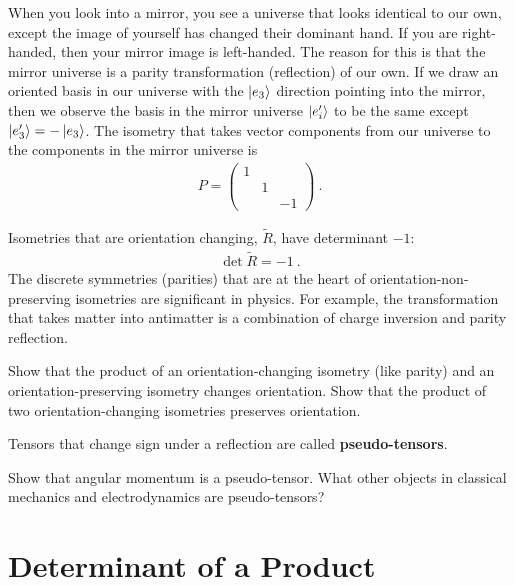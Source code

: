 \begin{example} When you look into a mirror, you see a universe that looks identical to our own, except the image of yourself has changed their dominant hand. If you are right-handed, then your mirror image is left-handed. The reason for this is that the mirror universe is a parity transformation (reflection) of our own. If we draw an oriented basis in our universe with the $\left|e_3\right\rangle$ direction pointing into the mirror, then we observe the basis in the mirror universe $\left|e'_i\right\rangle$ to be the same except $\left|e'_3\right\rangle = -\left|e_3\right\rangle$. The isometry that takes vector components from our universe to the components in the mirror universe is
\begin{align}
    P = \begin{pmatrix}
        1 & & \\
        & 1 & \\
        & & -1
    \end{pmatrix} \ .
\end{align}
\end{example}

Isometries that are orientation changing, $\tilde R$, have determinant $-1$:
\begin{align}
\det \tilde R = -1 \ .     
\end{align}
The discrete symmetries (parities) that are at the heart of orientation-non-preserving isometries are significant in physics.  For example, the transformation that takes matter into antimatter is a combination of charge inversion and parity reflection. 

\begin{example}
Show that the product of an orientation-changing isometry (like parity) and an orientation-preserving isometry changes orientation. Show that the product of two orientation-changing isometries preserves orientation.
\end{example}

Tensors that change sign under a reflection are called \textbf{pseudo-tensors}. 
\begin{exercise}
Show that angular momentum is a pseudo-tensor. What other objects in classical mechanics and electrodynamics are pseudo-tensors?
\end{exercise}


\section{Determinant of a Product}
\label{sec:determinant:of:product}

